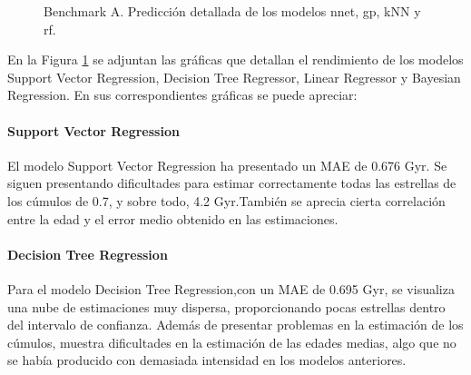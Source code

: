 \begin{figure}[h]
\begin{minipage}{.33\linewidth}
\end{minipage}%
\begin{minipage}{.33\linewidth}
\centering
{}
\end{minipage}
\caption{Benchmark A. Predicción detallada de los modelos nnet, gp, kNN y rf.}
\label{fig:benchA_details_1}
\end{figure}

En la Figura \ref{fig:benchA_details_1} se adjuntan las gráficas que detallan el rendimiento de los modelos Support Vector Regression, Decision Tree Regressor, Linear Regressor y Bayesian Regression. En sus correspondientes gráficas se puede apreciar:

\paragraph{Support Vector Regression} 
El modelo Support Vector Regression ha presentado un MAE de 0.676 Gyr. Se siguen presentando dificultades para estimar correctamente todas las estrellas de los cúmulos de 0.7, y sobre todo, 4.2 Gyr.También se aprecia cierta correlación entre la edad y el error medio obtenido en las estimaciones. 

\paragraph{Decision Tree Regression} 
Para el modelo Decision Tree Regression,con un MAE de 0.695 Gyr, se visualiza una nube de estimaciones muy dispersa, proporcionando pocas estrellas dentro del intervalo de confianza. Además de presentar problemas en la estimación de los cúmulos, muestra dificultades en la estimación de las edades medias, algo que no se había producido con demasiada intensidad en los modelos anteriores.

